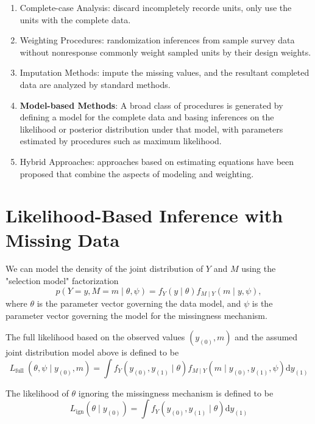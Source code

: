 \begin{enumerate}
    \item Complete-case Analysis: discard incompletely recorde units, only use the units with the complete data.
    \item Weighting Procedures: randomization inferences from sample survey data without nonresponse commonly weight sampled units by their design weights.
    \item Imputation Methods: impute the missing values, and the resultant completed data are analyzed by standard methods.
    \item \textbf{Model-based Methods}: A broad class of procedures is generated by defining a model for the complete data and basing inferences on the likelihood or posterior distribution under that model, with parameters estimated by procedures such as maximum likelihood.
    \item Hybrid Approaches: approaches based on estimating equations have been
          proposed that combine the aspects of modeling and weighting.
\end{enumerate}

\section{Likelihood-Based Inference with Missing Data}

We can model the density of the joint distribution of $Y$ and $M$ using the "selection model" factorization
\begin{equation*}
    p(Y=y,M=m\mid\theta,\psi)=f_{Y}(y\mid\theta)f_{M\mid Y}(m\mid y,\psi),
\end{equation*}
where $\theta$ is the parameter vector governing the data model, and $\psi$ is the parameter vector governing the model for the missingness mechanism.

The full likelihood based on the observed values $\left(y_{(0)}, m\right)$ and the assumed joint distribution model above is defined to be
\begin{equation}
    L_{\text {full }}\left(\theta, \psi \mid y_{(0)}, m\right)=\int f_{Y}\left(y_{(0)}, y_{(1)} \mid \theta\right) f_{M \mid Y}\left(m \mid y_{(0)}, y_{(1)}, \psi\right) \mathrm{d} y_{(1)}
\end{equation}

The likelihood of $\theta$ ignoring the missingness mechanism is defined to be
\begin{equation}
    L_{\mathrm{ign}}\left(\theta \mid y_{(0)}\right)=\int f_{Y}\left(y_{(0)}, y_{(1)} \mid \theta\right) \mathrm{d} y_{(1)}
\end{equation}

